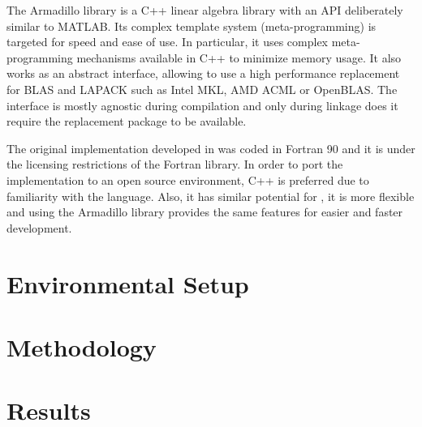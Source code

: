 \documentclass[../thesis]{subfiles}
\begin{document}
	The Armadillo library is a C++ linear algebra library with an API deliberately similar to MATLAB. Its complex template system (meta-programming) is targeted for speed and ease of use. In particular, it uses complex meta-programming mechanisms available in C++ to minimize memory usage. It also works as an abstract interface, allowing to use a high performance replacement for BLAS and LAPACK such as Intel MKL, AMD ACML or OpenBLAS. The interface is mostly agnostic during compilation and only during linkage does it require the replacement package to be available.

	The original implementation developed in \cite{Deadman:Higham:Ralha:2013} was coded in Fortran 90 and it is under the licensing restrictions of the \nag Fortran library. In order to port the implementation to an open source environment, C++ is preferred due to familiarity with the language. Also, it has similar potential for \hpc, it is more flexible and using the Armadillo library provides the same features for easier and faster development.

	
	
	
	

	\section{Environmental Setup}

	\section{Methodology}

	\section{Results}
\end{document}
